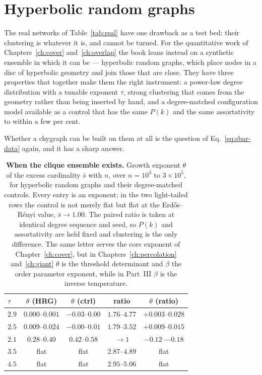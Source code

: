 \section{Hyperbolic random graphs}
\label{sec:hrg-data}

The real networks of Table~\ref{tab:real} have one drawback as a test bed: their
clustering is whatever it is, and cannot be turned. For the quantitative work of
Chapters~\ref{ch:cover} and~\ref{ch:overlap} the book leans instead on a
synthetic ensemble in which it can be --- hyperbolic random graphs, which place
nodes in a disc of hyperbolic geometry and join those that are close. They have
three properties that together make them the right instrument: a power-law
degree distribution with a tunable exponent $\tau$, strong clustering that comes
from the geometry rather than being inserted by hand, and a degree-matched
configuration model available as a control that has the same $P(k)$ and the same
assortativity to within a few per cent.

Whether a chygraph can be built on them at all is the question of
Eq.~\eqref{eq:sbar-data} again, and it has a sharp answer.

\begin{table}[t]
\centering\small
\begin{tabular}{lcccc}
\hline\hline
$\tau$ & $\theta$ (HRG) & $\theta$ (ctrl) & ratio & $\theta$ (ratio)\\
\hline
$2.9$ & $0.000$--$0.001$ & $-0.03$--$0.00$ & $1.76$--$4.77$ & $+0.003$--$0.028$\\
$2.5$ & $0.009$--$0.024$ & $-0.00$--$0.01$ & $1.79$--$3.52$ & $+0.009$--$0.015$\\
$2.1$ & $0.28$--$0.40$ & $0.42$--$0.58$ & $\to1$ & $-0.12$--$-0.18$\\
\hline
$3.5$ & flat & flat & $2.87$--$4.89$ & flat\\
$4.5$ & flat & flat & $2.95$--$5.06$ & flat\\
\hline\hline
\end{tabular}
\caption{\textbf{When the clique ensemble exists.} Growth exponent $\theta$ of
the excess cardinality $\bar s$ with $n$, over $n=10^{3}$ to $3\times10^{5}$,
for hyperbolic random graphs and their degree-matched controls. Every entry is
an exponent; in the two light-tailed rows the control is not merely flat but
flat at the Erd\H{o}s--R\'enyi value, $\bar s\to1.00$. The paired ratio
is taken at identical degree sequence and seed, so $P(k)$ and assortativity are
held fixed and clustering is the only difference. The same letter serves the
core exponent of Chapter~\ref{ch:cover}, but in
Chapters~\ref{ch:percolation} and~\ref{ch:giant} $\theta$ is the threshold
determinant and $\beta$ the order parameter exponent, while in Part~III $\beta$
is the inverse temperature.}
\label{tab:ensemble}
\end{table}

